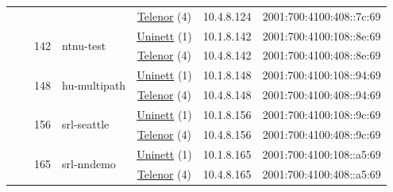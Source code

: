 \begin{small}
\begin{center}
\begin{longtable}{|c|c|c|c|c|c|c|c|}
  &  &  &  & \multicolumn{2}{|c|}{\tiny{\href{https://www.telenor.no}{Telenor} (4)}} & \tiny{10.4.8.124} & \tiny{2001:700:4100:408::7c:69} \\* \cline{3-3}\cline{4-4}\cline{5-5}\cline{6-6}\cline{7-7}\cline{8-8}
  &  & \multirow{2}{*}{\tiny{142}} & \multicolumn{1}{|l|}{\multirow{2}{*}{\tiny{ntnu-test}}} & \multicolumn{2}{|c|}{\tiny{\href{https://www.uninett.no}{Uninett} (1)}} & \tiny{10.1.8.142} & \tiny{2001:700:4100:108::8e:69} \\* \cline{5-5}\cline{6-6}\cline{7-7}\cline{8-8}
  &  &  &  & \multicolumn{2}{|c|}{\tiny{\href{https://www.telenor.no}{Telenor} (4)}} & \tiny{10.4.8.142} & \tiny{2001:700:4100:408::8e:69} \\* \cline{3-3}\cline{4-4}\cline{5-5}\cline{6-6}\cline{7-7}\cline{8-8}
  &  & \multirow{2}{*}{\tiny{148}} & \multicolumn{1}{|l|}{\multirow{2}{*}{\tiny{hu-multipath}}} & \multicolumn{2}{|c|}{\tiny{\href{https://www.uninett.no}{Uninett} (1)}} & \tiny{10.1.8.148} & \tiny{2001:700:4100:108::94:69} \\* \cline{5-5}\cline{6-6}\cline{7-7}\cline{8-8}
  &  &  &  & \multicolumn{2}{|c|}{\tiny{\href{https://www.telenor.no}{Telenor} (4)}} & \tiny{10.4.8.148} & \tiny{2001:700:4100:408::94:69} \\* \cline{3-3}\cline{4-4}\cline{5-5}\cline{6-6}\cline{7-7}\cline{8-8}
  &  & \multirow{2}{*}{\tiny{156}} & \multicolumn{1}{|l|}{\multirow{2}{*}{\tiny{srl-seattle}}} & \multicolumn{2}{|c|}{\tiny{\href{https://www.uninett.no}{Uninett} (1)}} & \tiny{10.1.8.156} & \tiny{2001:700:4100:108::9c:69} \\* \cline{5-5}\cline{6-6}\cline{7-7}\cline{8-8}
  &  &  &  & \multicolumn{2}{|c|}{\tiny{\href{https://www.telenor.no}{Telenor} (4)}} & \tiny{10.4.8.156} & \tiny{2001:700:4100:408::9c:69} \\* \cline{3-3}\cline{4-4}\cline{5-5}\cline{6-6}\cline{7-7}\cline{8-8}
  &  & \multirow{2}{*}{\tiny{165}} & \multicolumn{1}{|l|}{\multirow{2}{*}{\tiny{srl-nndemo}}} & \multicolumn{2}{|c|}{\tiny{\href{https://www.uninett.no}{Uninett} (1)}} & \tiny{10.1.8.165} & \tiny{2001:700:4100:108::a5:69} \\* \cline{5-5}\cline{6-6}\cline{7-7}\cline{8-8}
  &  &  &  & \multicolumn{2}{|c|}{\tiny{\href{https://www.telenor.no}{Telenor} (4)}} & \tiny{10.4.8.165} & \tiny{2001:700:4100:408::a5:69} \\ \hline
\end{longtable}
\end{center}
\end{small}



